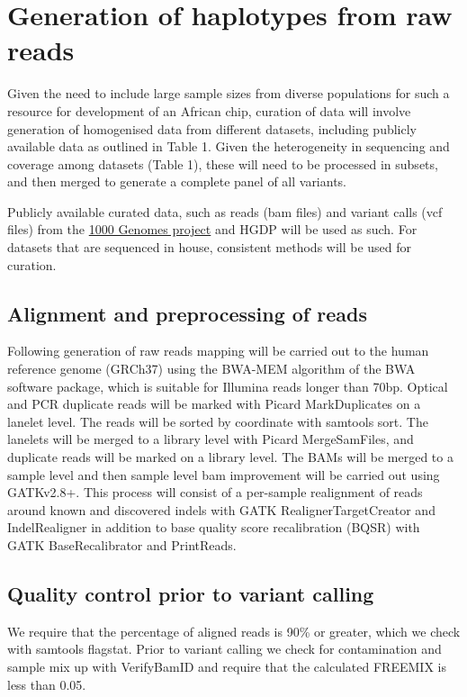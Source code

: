 \section{Generation of haplotypes from raw reads}
Given the need to include large sample sizes from diverse populations for such a resource for development of an African chip, curation of data will involve generation of homogenised data from different datasets, including publicly available data as outlined in Table 1. Given the heterogeneity in sequencing and coverage among datasets (Table 1), these will need to be processed in subsets, and then merged to generate a complete panel of all variants. 

Publicly available curated data, such as reads (bam files) and variant calls (vcf files) from the \href{http://www.1000genomes.org}{1000 Genomes project} and HGDP
will be used as such. For datasets that are sequenced in house, consistent methods will be used for curation.

\subsection{Alignment and preprocessing of reads}
Following generation of raw reads mapping will be carried out to the human reference genome (GRCh37) using the BWA-MEM algorithm of the BWA software package, which is suitable for Illumina reads longer than 70bp.\cite{2013arXiv1303.3997L} Optical and PCR duplicate reads will be marked with Picard MarkDuplicates on a lanelet level. The reads will be sorted by coordinate with samtools sort. The lanelets will be merged to a library level with Picard MergeSamFiles, and duplicate reads will be marked on a library level. The BAMs will be merged to a sample level and then sample level bam improvement will be carried out using GATKv2.8+. This process will consist of a per-sample realignment of reads around known and discovered indels with GATK RealignerTargetCreator and IndelRealigner in addition to base quality score recalibration (BQSR) with GATK BaseRecalibrator and PrintReads.

\subsection{Quality control prior to variant calling}
We require that the percentage of aligned reads is 90\% or greater, which we check with samtools flagstat. Prior to variant calling we check for contamination and sample mix up with VerifyBamID and require that the calculated FREEMIX is less than 0.05.









